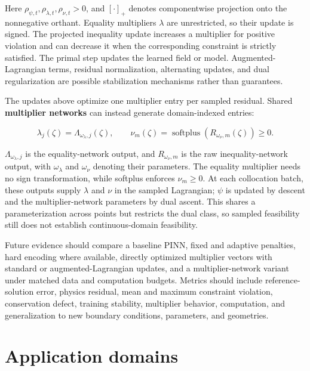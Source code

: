 \documentclass[a4paper]{article}
\begin{document}
Here $\rho_{\psi,t},\rho_{\lambda,t},\rho_{\nu,t}>0$, and $[\cdot]_+$ denotes
componentwise projection onto the nonnegative orthant. Equality multipliers
$\lambda$ are unrestricted, so their update is signed. The projected
inequality update increases a multiplier for positive violation and can
decrease it when the corresponding constraint is strictly satisfied. The
primal step updates the learned field or model.
Augmented-Lagrangian terms, residual normalization, alternating updates, and
dual regularization are possible stabilization mechanisms rather than
guarantees.

The updates above optimize one multiplier entry per sampled residual. Shared
\textbf{multiplier networks} can instead generate domain-indexed entries:

\begin{equation}
\lambda_j(\zeta)
=
\Lambda_{\omega_\lambda,j}(\zeta),
\qquad
\nu_m(\zeta)
=
\operatorname{softplus}
\!\left(
R_{\omega_\nu,m}(\zeta)
\right)
\ge0.
\end{equation}

$\Lambda_{\omega_\lambda,j}$ is the equality-network output, and
$R_{\omega_\nu,m}$ is the raw inequality-network output, with
$\omega_\lambda$ and $\omega_\nu$ denoting their parameters. The equality
multiplier needs no sign transformation, while softplus enforces
$\nu_m\ge0$. At each collocation batch, these outputs supply $\lambda$ and
$\nu$ in the sampled Lagrangian; $\psi$ is updated by descent and the
multiplier-network parameters by dual ascent. This shares a parameterization
across points but restricts the dual class, so sampled feasibility still does
not establish continuous-domain feasibility.

Future evidence should compare a baseline PINN, fixed and adaptive penalties,
hard encoding where available, directly optimized multiplier vectors with
standard or augmented-Lagrangian updates, and a multiplier-network variant
under matched data and computation budgets.
Metrics should include reference-solution error, physics residual, mean and
maximum constraint violation, conservation defect, training stability,
multiplier behavior, computation, and generalization to new boundary
conditions, parameters, and geometries.

\section{Application domains}
\end{document}
